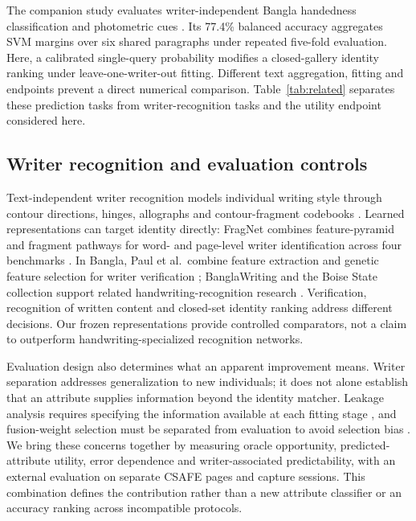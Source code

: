 \documentclass[ASNA,twocolumn]{USG}
\begin{document}
The companion study evaluates writer-independent Bangla handedness classification and photometric cues \cite{prappo2026handedness}. Its 77.4\% balanced accuracy aggregates SVM margins over six shared paragraphs under repeated five-fold evaluation. Here, a calibrated single-query probability modifies a closed-gallery identity ranking under leave-one-writer-out fitting. Different text aggregation, fitting and endpoints prevent a direct numerical comparison. Table~\ref{tab:related} separates these prediction tasks from writer-recognition tasks and the utility endpoint considered here.

\subsection{Writer recognition and evaluation controls}
Text-independent writer recognition models individual writing style through contour directions, hinges, allographs and contour-fragment codebooks \cite{bulacu2007text,schomaker2007codebooks}. Learned representations can target identity directly: FragNet combines feature-pyramid and fragment pathways for word- and page-level writer identification across four benchmarks \cite{he2020fragnet}. In Bangla, Paul et al.\ combine feature extraction and genetic feature selection for writer verification \cite{paul2024bangla}; BanglaWriting and the Boise State collection support related handwriting-recognition research \cite{mridha2021banglawriting,majid2018bangla}. Verification, recognition of written content and closed-set identity ranking address different decisions. Our frozen representations provide controlled comparators, not a claim to outperform handwriting-specialized recognition networks.

Evaluation design also determines what an apparent improvement means. Writer separation addresses generalization to new individuals; it does not alone establish that an attribute supplies information beyond the identity matcher. Leakage analysis requires specifying the information available at each fitting stage \cite{kaufman2012leakage}, and fusion-weight selection must be separated from evaluation to avoid selection bias \cite{cawley2010selection}. We bring these concerns together by measuring oracle opportunity, predicted-attribute utility, error dependence and writer-associated predictability, with an external evaluation on separate CSAFE pages and capture sessions. This combination defines the contribution rather than a new attribute classifier or an accuracy ranking across incompatible protocols.
\end{document}
